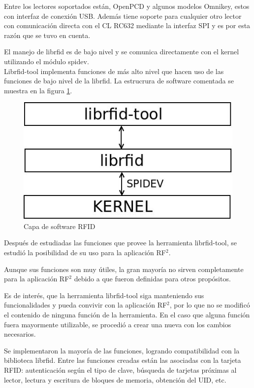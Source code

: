\documentclass[%
        final,
        notitlepage,
        narroweqnarray,
        inline,
        ]{ieee}
\begin{document}
Entre los lectores soportados están, OpenPCD y algunos modelos Omnikey, estos con interfaz de conexión USB. Además tiene soporte para cualquier otro lector con comunicación directa con el CL RC632 mediante la interfaz SPI y es por esta razón que se tuvo en cuenta.

El manejo de librfid es de bajo nivel y se comunica directamente con el kernel utilizando el módulo spidev. \\
Librfid-tool implementa funciones de más alto nivel que hacen uso de las funciones de bajo nivel de la librfid. La estrucrura de software comentada se muestra en la figura \ref{sw_RFID}.

\begin{figure}[h]
\centering
  \begin{center}
  \includegraphics[scale=.4]{../docs/Imagenes/librfid-tool.jpg} 
  \end{center}
  \caption{Capa de software RFID}\label{sw_RFID} 
\end{figure}


Después de estudiadas las funciones que provee la herramienta librfid-tool, se estudió la posibilidad de su uso para la aplicación RF$^{2}$. 

Aunque sus funciones  son muy útiles, la gran mayoría no sirven completamente para la aplicación RF$^{2}$ debido a que fueron definidas para otros propósitos. 

Es de interés, que la herramienta librfid-tool siga manteniendo sus funcionalidades y pueda convivir con la aplicación RF$^{2}$, por lo que no se modificó el contenido de ninguna función de la herramienta. En el caso que alguna función fuera mayormente utilizable, se procedió a crear una nueva con los cambios necesarios.

Se implementaron la mayoría de las funciones, logrando compatibilidad con la biblioteca librfid. Entre las funciones creadas están las asociadas con la tarjeta RFID: autenticación según el tipo de clave, búsqueda de tarjetas próximas al lector, lectura y escritura de bloques de memoria, obtención del UID, etc.
\end{document}
